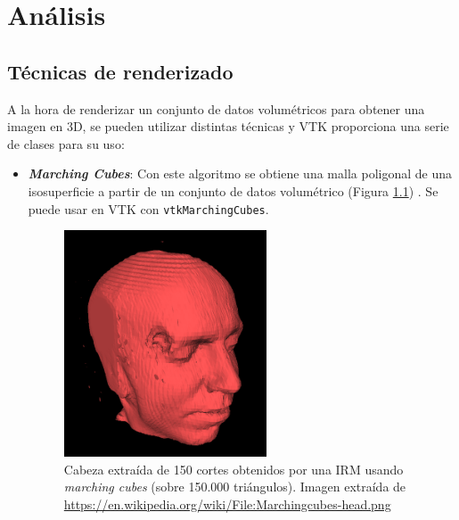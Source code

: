 \chapter{Análisis}

\section{Técnicas de renderizado}

A la hora de renderizar un conjunto de datos volumétricos para obtener una imagen en 3D, se pueden utilizar distintas técnicas y VTK proporciona una serie de clases para su uso:
\begin{itemize}
	\item \textbf{\textit{Marching Cubes}}: Con este algoritmo se obtiene una malla poligonal de una isosuperficie a partir de un conjunto de datos volumétrico (Figura \ref{fig:marching_cubes_head}) \cite{marching_cubes}. Se puede usar en VTK con \texttt{vtkMarchingCubes}.
	\begin{figure}[H]
		\centering
		\includegraphics[width=6cm]{imagenes/marching_cubes_head}
		\caption{Cabeza extraída de 150 cortes obtenidos por una IRM usando \textit{marching cubes} (sobre 150.000 triángulos). Imagen extraída de \url{https://en.wikipedia.org/wiki/File:Marchingcubes-head.png}}
		\label{fig:marching_cubes_head}
	\end{figure}
	

\end{itemize}
